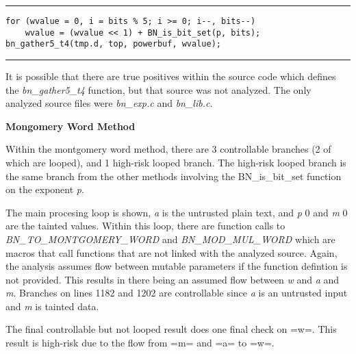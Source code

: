 \documentclass[11pt,a4paper]{article}
\newcommand{\codevar}[1]{\textit{#1}}
\newcommand{\codefn}[1]{\textit{#1}}
\newcommand{\codefile}[1]{\textit{#1}}
\newcommand{\ruleabove}{\vspace{5pt}\hrule}
\newcommand{\rulebelow}{\hrule\vspace{5pt}}
\begin{document}
  
\ruleabove
\begin{lstlisting}[caption=OpenSSL 1.1.0g - bn\_exp.c lines 852-854]
for (wvalue = 0, i = bits % 5; i >= 0; i--, bits--)
    wvalue = (wvalue << 1) + BN_is_bit_set(p, bits);
bn_gather5_t4(tmp.d, top, powerbuf, wvalue);
\end{lstlisting}
\rulebelow

  It is possible that there are true positives within the source code which
  defines the \codefn{bn\_gather5\_t4} function, but that source was not analyzed. The only
  analyzed source files were \codefile{bn\_exp.c} and \codefile{bn\_lib.c}.

\noindent
\textbf{Mongomery Word Method}


   Within the montgomery word method, there are 3 controllable branches (2 of
   which are looped), and 1 high-risk looped branch. The high-risk looped branch
   is the same branch from the other methods involving the BN\_is\_bit\_set
   function on the exponent \codevar{p}.

   The main procesing loop is shown, \codevar{a} is the untrusted plain text,
   and \codevar{p} 0 and \codevar{m} 0 are the tainted values. Within this loop,
   there are function calls to \codefn{BN\_TO\_MONTGOMERY\_WORD} and
   \codefn{BN\_MOD\_MUL\_WORD} which are macros that call functions that are not
   linked with the analyzed source. Again, the analysis assumes flow between
   mutable parameters if the function defintion is not provided. This results in
   there being an assumed flow between \codevar{w} and \codevar{a} and \codevar{m}.
   Branches on lines 1182 and 1202 are controllable since \codevar{a} is an
   untrusted input and \codevar{m} is tainted data.

   The final controllable but not looped result does one final check on =w=.
   This result is high-risk due to the flow from =m= and =a= to =w=.
\end{document}
